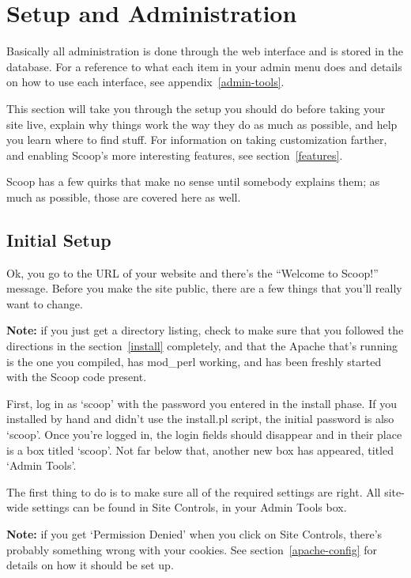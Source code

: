 \section{Setup and Administration}
\label{admin}

Basically all administration is done through the web interface and is stored in the database.  For a reference to what each item in your admin menu does and details on how to use each interface, see appendix~\ref{admin-tools}.

This section will take you through the setup you should do before taking your site live, explain why things work the way they do as much as possible, and help you learn where to find stuff.  For information on taking customization farther, and enabling Scoop's more interesting features, see section~\ref{features}.

Scoop has a few quirks that make no sense until somebody explains them; as much as possible, those are covered here as well.

\subsection{Initial Setup}
\label{initial-setup}

Ok, you go to the URL of your website and there's the ``Welcome to Scoop!'' message.  Before you make the site public, there are a few things that you'll really want to change.

{\bf Note:} if you just get a directory listing, check to make sure that you followed the directions in the section~\ref{install} completely, and that the Apache that's running is the one you compiled, has mod\_perl working, and has been freshly started with the Scoop code present.

First, log in as `scoop' with the password you entered in the install phase.  If you installed by hand and didn't use the install.pl script, the initial password is also `scoop'.  Once you're logged in, the login fields should disappear and in their place is a box titled `scoop'.  Not far below that, another new box has appeared, titled `Admin Tools'.

The first thing to do is to make sure all of the required settings are right.  All site-wide settings can be found in Site Controls, in your Admin Tools box.

{\bf Note:} if you get `Permission Denied' when you click on Site Controls, there's probably something wrong with your cookies.  See section~\ref{apache-config} for details on how it should be set up.

